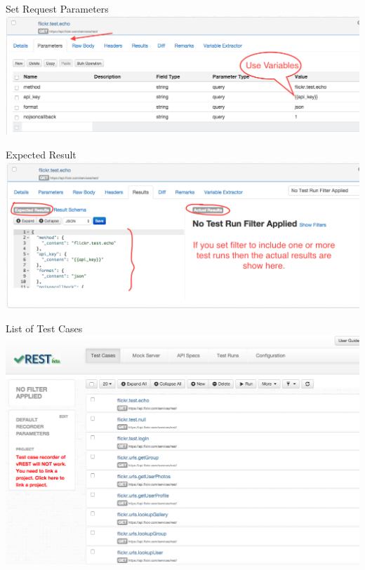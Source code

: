 \documentclass{beamer}
\begin{document}
\begin{frame}{Set Request Parameters}
    \includegraphics[scale=0.30]{images/test_case_parameters.PNG}
\end{frame}
\begin{frame}{Expected Result}
    \includegraphics[scale=0.30]{images/expected_result.PNG}
\end{frame}
\begin{frame}{List of Test Cases}
    \includegraphics[scale=0.30]{images/list_of_test_cases.PNG}
\end{frame}
\end{document}
